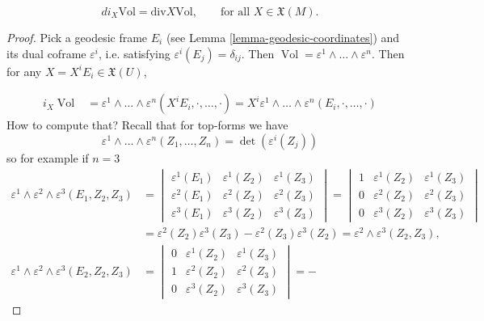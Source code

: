 \begin{lemma}
\label{lemma-divergence-and-volume}
\begin{equation}
\label{equation-divergence-and-volume}
di_X\text{Vol}=\text{div}X\text{Vol},\qquad
\text{for all }X\in \mathfrak{X}(M).
\end{equation}
\end{lemma}

\begin{proof}
Pick a geodesic frame $E_i$ (see Lemma
\ref{lemma-geodesic-coordinates}) and
its dual coframe $\varepsilon^i$, i.e.
satisfying
$\varepsilon^i(E_j)=\delta_{ij}$. Then
$\operatorname{Vol}=\varepsilon^1
\wedge \ldots \wedge \varepsilon^n$. Then for
any $X=X^iE_i \in
\mathfrak{X}(U)$,

$$
\begin{aligned}
i_X\operatorname{Vol}
&=
\varepsilon^1\wedge\ldots\wedge
\varepsilon^n(X^iE_i,\cdot,\ldots,\cdot)
=X^i\varepsilon^1\wedge\ldots\wedge
\varepsilon^n(E_i,\cdot,\ldots,\cdot)
\end{aligned}
$$
How to compute that? Recall that for
top-forms we have
$$
\varepsilon^1\wedge\ldots\wedge
\varepsilon^n(Z_1,\ldots,Z_n)
=\det(\varepsilon^i(Z_j))
$$
so for example if $n=3$
\begin{align*}\varepsilon^1\wedge
\varepsilon^2\wedge\varepsilon^3(E_1,Z_2,Z_3)
&=\begin{vmatrix}
\varepsilon^1(E_1)&\varepsilon^1(Z_2)
&\varepsilon^1(Z_3)\\
\varepsilon^2(E_1)&\varepsilon^2(Z_2)&
\varepsilon^2(Z_3)\\
\varepsilon^3(E_1)&\varepsilon^3(Z_2)&
\varepsilon^3(Z_3)
\end{vmatrix}
=\begin{vmatrix}
1&\varepsilon^1(Z_2) &\varepsilon^1(Z_3)\\
0&\varepsilon^2(Z_2)&\varepsilon^2(Z_3)\\
0&\varepsilon^3(Z_2)&\varepsilon^3(Z_3)
\end{vmatrix}\\
&=\varepsilon^2(Z_2)\varepsilon^3(Z_3)-
\varepsilon^2(Z_3)\varepsilon^3(Z_2)
=\varepsilon^2\wedge\varepsilon^3(Z_2,Z_3),\\
\varepsilon^1\wedge\varepsilon^2\wedge
\varepsilon^3(E_2,Z_2,Z_3)
&=\begin{vmatrix}
0&\varepsilon^1(Z_2) &\varepsilon^1(Z_3)\\
1&\varepsilon^2(Z_2)&\varepsilon^2(Z_3)\\
0&\varepsilon^3(Z_2)&\varepsilon^3(Z_3)
\end{vmatrix}=-

\end{align*}
\end{proof}
